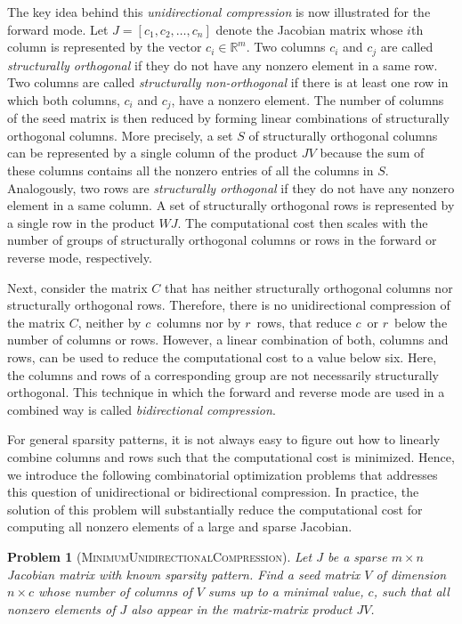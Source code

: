 \documentclass[12pt, oneside]{book}
\newtheorem{problem}{Problem}
\newcommand{\setR}{\ensuremath{\mathbb{R}}}
\newcommand{\col}{\ensuremath{c}}
\newcommand{\row}{\ensuremath{r}}
\newcommand{\MinUniCom}{\textsc{MinimumUnidirectionalCompression}}
\begin{document}
The key idea behind this \emph{unidirectional compression} is now illustrated for the
forward mode. Let $J=[c_1, c_2, \dots, c_n]$ denote the Jacobian matrix whose $i$th
column is represented by the vector $c_i \in \setR^m$. Two columns $c_i$ and $c_j$ are
called \emph{structurally orthogonal} if they do not have any nonzero element in a same
row. Two columns are called \emph{structurally non-orthogonal} if there is at least one
row in which both columns, $c_i$ and $c_j$, have a nonzero element. The number of columns
of the seed matrix is then reduced by forming linear combinations of structurally
orthogonal columns. More precisely, a set $S$ of structurally orthogonal columns can be
represented by a single column of the product $JV$ because the sum of these columns
contains all the nonzero entries of all the columns in $S$. Analogously, two rows are
\emph{structurally orthogonal} if they do not have any nonzero element in a same column.
A set of structurally orthogonal rows is represented by a single row in the product $WJ$.
The computational cost then scales with the number of groups of structurally orthogonal
columns or rows in the forward or reverse mode, respectively.

Next, consider the matrix $C$ that has neither structurally orthogonal columns nor
structurally orthogonal rows. Therefore, there is no unidirectional compression of the
matrix $C$, neither by \col\ columns nor by \row\ rows, that reduce \col\ or \row\ below
the number of columns or rows. However, a linear combination of both, columns and rows, can be used to
reduce the computational cost to a value below six. Here, the columns and rows of a
corresponding group are not necessarily structurally orthogonal. This technique in which
the forward and reverse mode are used in a combined way is called \emph{bidirectional
compression}. 

For general sparsity patterns,
it is not always easy to figure out how to linearly combine columns and rows such that
the computational cost is minimized. Hence, we introduce the following combinatorial
optimization problems that addresses this question of unidirectional or bidirectional compression. 
In practice, the solution of this
problem will substantially reduce the computational cost for computing all nonzero
elements of a large and sparse Jacobian.

\begin{problem}[\MinUniCom]
\label{p.seed.uni} Let $J$ be a sparse ${m\times n}$ Jacobian matrix with known sparsity
pattern. Find a seed matrix $V$ of dimension $n\times \col$ 
whose number of columns of $V$ sums up
to a minimal value, $\col$, such that all nonzero elements of $J$ also appear in
the matrix-matrix product $JV$.
\end{problem}
\end{document}

